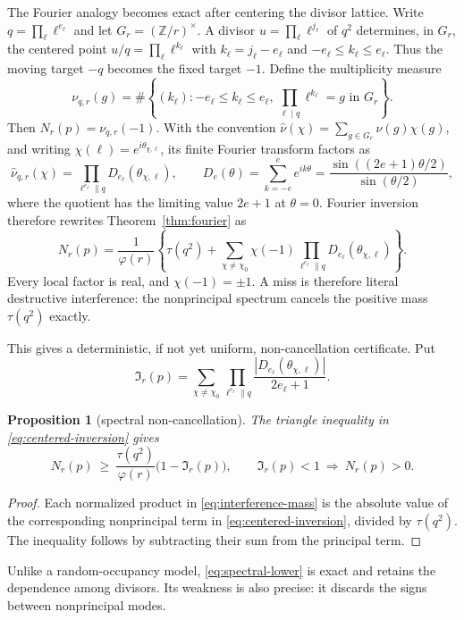 \documentclass[11pt]{article}
\newtheorem{proposition}[theorem]{Proposition}
\theoremstyle{definition}
\theoremstyle{remark}
\begin{document}
The Fourier analogy becomes exact after centering the divisor lattice. Write
$q=\prod_\ell \ell^{e_\ell}$ and let $G_r=(\mathbb Z/r)^\times$. A divisor
$u=\prod_\ell\ell^{j_\ell}$ of $q^2$ determines, in $G_r$, the centered point
$u/q=\prod_\ell\ell^{k_\ell}$ with $k_\ell=j_\ell-e_\ell$ and
$-e_\ell\leq k_\ell\leq e_\ell$. Thus the moving target $-q$ becomes the fixed target
$-1$. Define the multiplicity measure
\[
 \nu_{q,r}(g)=\#\left\{(k_\ell): -e_\ell\leq k_\ell\leq e_\ell,
       \ \prod_{\ell\mid q}\ell^{k_\ell}=g\text{ in }G_r\right\}.
\]
Then $N_r(p)=\nu_{q,r}(-1)$. With the convention
$\widehat\nu(\chi)=\sum_{g\in G_r}\nu(g)\chi(g)$, and writing
$\chi(\ell)=e^{i\theta_{\chi,\ell}}$, its finite Fourier transform factors as
\begin{equation}\label{eq:centered-transform}
 \widehat\nu_{q,r}(\chi)
 =\prod_{\ell^{e_\ell}\parallel q}D_{e_\ell}(\theta_{\chi,\ell}),
 \qquad
 D_e(\theta)=\sum_{k=-e}^{e}e^{ik\theta}
 =\frac{\sin((2e+1)\theta/2)}{\sin(\theta/2)},
\end{equation}
where the quotient has the limiting value $2e+1$ at $\theta=0$. Fourier inversion
therefore rewrites Theorem~\ref{thm:fourier} as
\begin{equation}\label{eq:centered-inversion}
 N_r(p)=\frac{1}{\varphi(r)}\left\{
 \tau(q^2)+\sum_{\chi\neq\chi_0}\chi(-1)
 \prod_{\ell^{e_\ell}\parallel q}D_{e_\ell}(\theta_{\chi,\ell})\right\}.
\end{equation}
Every local factor is real, and $\chi(-1)=\pm1$. A miss is therefore literal
destructive interference: the nonprincipal spectrum cancels the positive mass
$\tau(q^2)$ exactly.

This gives a deterministic, if not yet uniform, non-cancellation certificate. Put
\begin{equation}\label{eq:interference-mass}
 \mathfrak I_r(p)=\sum_{\chi\neq\chi_0}
 \prod_{\ell^{e_\ell}\parallel q}
 \frac{|D_{e_\ell}(\theta_{\chi,\ell})|}{2e_\ell+1}.
\end{equation}
\begin{proposition}[spectral non-cancellation]\label{prop:spectral-noncancellation}
The triangle inequality in \eqref{eq:centered-inversion} gives
\begin{equation}\label{eq:spectral-lower}
 N_r(p)\ \geq\ \frac{\tau(q^2)}{\varphi(r)}\bigl(1-\mathfrak I_r(p)\bigr),
 \qquad
 \mathfrak I_r(p)<1\ \Longrightarrow\ N_r(p)>0.
\end{equation}
\end{proposition}
\begin{proof}
Each normalized product in \eqref{eq:interference-mass} is the absolute value of the
corresponding nonprincipal term in \eqref{eq:centered-inversion}, divided by
$\tau(q^2)$. The inequality follows by subtracting their sum from the principal term.
\end{proof}
Unlike a random-occupancy model, \eqref{eq:spectral-lower} is exact and retains the
dependence among divisors. Its weakness is also precise: it discards the signs between
nonprincipal modes.
\end{document}
